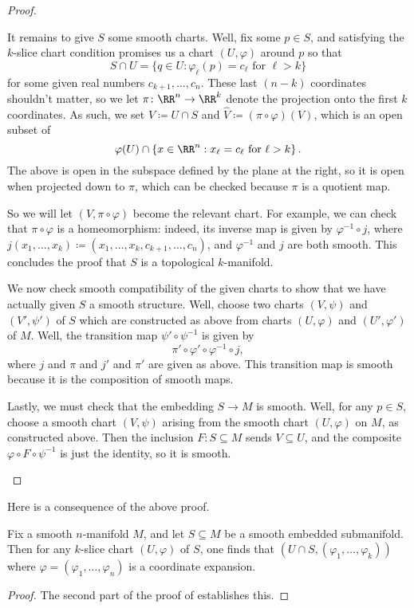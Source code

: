 \documentclass[../notes.tex]{subfiles}
\begin{document}
\begin{proof}
\begin{itemize}
		It remains to give $S$ some smooth charts. Well, fix some $p\in S$, and satisfying the $k$-slice chart condition promises us a chart $(U,\varphi)$ around $p$ so that
		\[S\cap U=\{q\in U:\varphi_\ell(p)=c_\ell\text{ for }\ell>k\}\]
		for some given real numbers $c_{k+1},\ldots,c_n$. These last $(n-k)$ coordinates shouldn't matter, so we let $\pi\colon\RR^n\to\RR^k$ denote the projection onto the first $k$ coordinates. As such, we set $V\coloneqq U\cap S$ and $\widehat V\coloneqq(\pi\circ\varphi)(V)$, which is an open subset of
		\[\varphi(U)\cap\left\{x\in\RR^n:x_\ell=c_\ell\text{ for }\ell>k\right\}.\]
		The above is open in the subspace defined by the plane at the right, so it is open when projected down to $\pi$, which can be checked because $\pi$ is a quotient map.
		
		So we will let $(V,\pi\circ\varphi)$ become the relevant chart. For example, we can check that $\pi\circ\varphi$ is a homeomorphism: indeed, its inverse map is given by $\varphi^{-1}\circ j$, where $j(x_1,\ldots,x_k)\coloneqq(x_1,\ldots,x_k,c_{k+1},\ldots,c_n)$, and $\varphi^{-1}$ and $j$ are both smooth. This concludes the proof that $S$ is a topological $k$-manifold.

		We now check smooth compatibility of the given charts to show that we have actually given $S$ a smooth structure. Well, choose two charts $(V,\psi)$ and $(V',\psi')$ of $S$ which are constructed as above from charts $(U,\varphi)$ and $(U',\varphi')$ of $M$. Well, the transition map $\psi'\circ\psi^{-1}$ is given by
		\[\pi'\circ\varphi'\circ\varphi^{-1}\circ j,\]
		where $j$ and $\pi$ and $j'$ and $\pi'$ are given as above. This transition map is smooth because it is the composition of smooth maps.

		Lastly, we must check that the embedding $S\to M$ is smooth. Well, for any $p\in S$, choose a smooth chart $(V,\psi)$ arising from the smooth chart $(U,\varphi)$ on $M$, as constructed above. Then the inclusion $F\colon S\subseteq M$ sends $V\subseteq U$, and the composite $\varphi\circ F\circ\psi^{-1}$ is just the identity, so it is smooth.
		\qedhere
	\end{itemize}
\end{proof}
Here is a consequence of the above proof.
\begin{corollary}
	Fix a smooth $n$-manifold $M$, and let $S\subseteq M$ be a smooth embedded submanifold. Then for any $k$-slice chart $(U,\varphi)$ of $S$, one finds that $(U\cap S,(\varphi_1,\ldots,\varphi_k))$ where $\varphi=(\varphi_1,\ldots,\varphi_n)$ is a coordinate expansion.
\end{corollary}
\begin{proof}
	The second part of the proof of  establishes this.
\end{proof}
\end{document}
